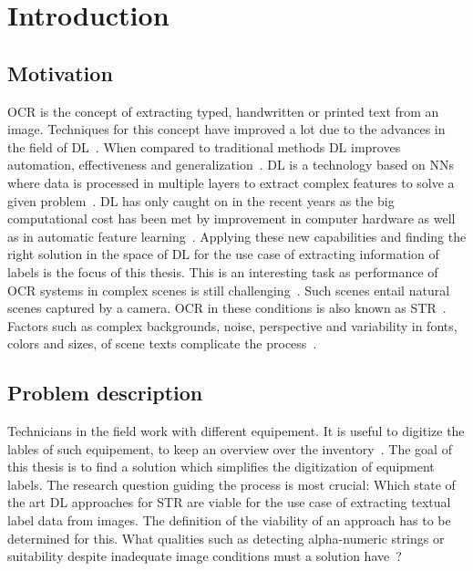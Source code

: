 \chapter{Introduction}\label{ch:intro}
\section{Motivation}
\ac{OCR} is the concept of extracting typed, handwritten or printed text
from an image.
Techniques for this concept have improved a lot due to the advances in the field of
\ac{DL}~\citep{zhao_improving_2020}.
When compared to traditional methods \ac{DL} improves automation, effectiveness and
generalization~\citep{chen_text_2021}.
\ac{DL} is a technology based on \acp{NN} where data is processed
in multiple layers to extract complex features to solve a given problem~\citep{shrestha_review_2019}.
\ac{DL} has only caught on in the recent years as the big computational cost has been met
by improvement in computer hardware as well as in automatic feature
learning~\citep{ponti_everything_2017, chen_text_2021}.
Applying these new capabilities and finding the right solution in the space of \ac{DL} for the
use case of extracting information of labels is the focus of this thesis.
This is an interesting task as performance of \ac{OCR} systems in complex scenes is still
challenging~\citep{zhao_improving_2020}.
Such scenes entail natural scenes captured by a camera.
\ac{OCR} in these conditions is also known as \ac{STR}~\citep{chen_text_2021}.
Factors such as complex backgrounds, noise, perspective and variability in fonts, colors and sizes,
of scene texts complicate the process~\citep{hu_gtc_2020,chen_text_2021}.

\section{Problem description}\label{se:problem}
Technicians in the field work with different equipement.
It is useful to digitize the lables of such equipement, to keep an overview over the
inventory~\citep{abramowicz_business_2019}.
The goal of this thesis is to find a solution which simplifies the digitization of equipment labels.
The research question guiding the process is most crucial: Which state of the art \ac{DL}
approaches for \ac{STR} are viable for the use case of extracting textual label data from images.
The definition of the viability of an approach has to be determined for this.
What qualities such as detecting alpha-numeric strings or suitability despite
inadequate image conditions must a solution have~\citep{ghosh_visual_2017, hu_gtc_2020}?

